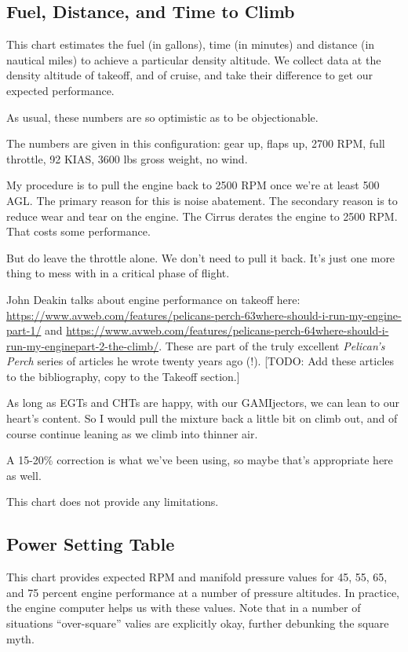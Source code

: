 \subsection{Fuel, Distance, and Time to Climb}

This chart estimates the fuel (in gallons), time (in minutes) and distance (in nautical miles) to achieve a particular density altitude. We collect data at the density altitude of takeoff, and of cruise, and take their difference to get our expected performance.

As usual, these numbers are so optimistic as to be objectionable.

The numbers are given in this configuration: gear up, flaps up, 2700 RPM, full throttle, 92 KIAS, 3600 lbs gross weight, no wind.

My procedure is to pull the engine back to 2500 RPM once we're at least 500 AGL. The primary reason for this is noise abatement. The secondary reason is to reduce wear and tear on the engine. The Cirrus derates the engine to 2500 RPM. That costs some performance.

But do leave the throttle alone. We don't need to pull it back. It's just one more thing to mess with in a critical phase of flight.

John Deakin talks about engine performance on takeoff here: \url{https://www.avweb.com/features/pelicans-perch-63where-should-i-run-my-engine-part-1/} and \url{https://www.avweb.com/features/pelicans-perch-64where-should-i-run-my-enginepart-2-the-climb/}. These are part of the truly excellent \emph{Pelican's Perch} series of articles he wrote twenty years ago (!). [TODO: Add these articles to the bibliography, copy to the Takeoff section.]

As long as EGTs and CHTs are happy, with our GAMIjectors, we can lean to our heart's content. So I would pull the mixture back a little bit on climb out, and of course continue leaning as we climb into thinner air.

A 15-20\% correction is what we've been using, so maybe that's appropriate here as well.

This chart does not provide any limitations.

\subsection{Power Setting Table}

This chart provides expected RPM and manifold pressure values for 45, 55, 65, and 75 percent engine performance at a number of pressure altitudes. In practice, the engine computer helps us with these values. Note that in a number of situations ``over-square'' valies are explicitly okay, further debunking the square myth.

